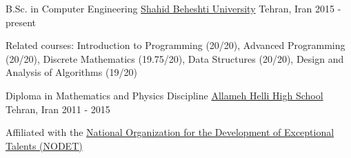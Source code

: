 

\begin{cventries}

  \cventry
    {B.Sc. in Computer Engineering} %
    {\href{http://en.sbu.ac.ir}{Shahid Beheshti University}} %
    {Tehran, Iran} %
    {2015 - present} %
    {
      \begin{cvitems} %
        \item {Related courses: Introduction to Programming (20/20), Advanced Programming (20/20), Discrete Mathematics (19.75/20), Data Structures (20/20), Design and Analysis of Algorithms (19/20)}
      \end{cvitems}
    }

  \cventry
    {Diploma in Mathematics and Physics Discipline} %
    {\href{http://helli.ir}{Allameh Helli High School}} %
    {Tehran, Iran} %
    {2011 - 2015} %
    {
      \begin{cvitems} %
        \item {Affiliated with the \href{http://nodet.net}{National Organization for the Development of Exceptional Talents (NODET)}}
      \end{cvitems}
    }

\end{cventries}
